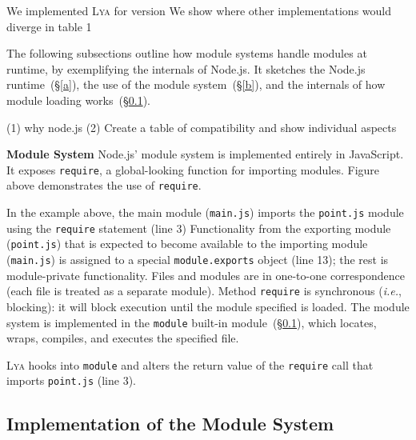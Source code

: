 \documentclass[letterpaper,twocolumn,10pt]{article}
\def\ie{{\em i.e.}, }
\newcommand{\heading}[1]{\vspace{2pt}\noindent\textbf{#1}\enspace}
\newcommand{\ttt}[1]{\texttt{#1}}
\newcommand{\sx}[1]{(\S\ref{#1})}
\newcommand{\sys}{{\scshape Lya}\xspace}
\newcommand{\fixme}[1]{{\color{red}#1}}
\begin{document}
We implemented \sys for version 
We show where other implementations would diverge in table 1

The following subsections outline how module systems handle modules at runtime, by exemplifying the internals of Node.js.
It sketches the Node.js runtime~\sx{a}, the use of the module system~\sx{b}, and the internals of how module loading works~\sx{c}.

(1) why node.js
(2) Create a table of compatibility and show individual aspects

\heading{Module System}
Node.js' module system is implemented entirely in JavaScript.
It exposes \ttt{require}, a global-looking function for importing modules.
\fixme{Figure} above demonstrates the use of \ttt{require}.

% 

In the example above, the main module (\ttt{main.js}) imports the \ttt{point.js} module using the \ttt{require} statement (line 3)
Functionality from the exporting module (\ttt{point.js}) that is expected to become available to the importing module (\ttt{main.js}) is assigned to a special \ttt{module.exports} object (line 13);
  the rest is module-private functionality.
Files and modules are in one-to-one correspondence (each file is treated as a separate module).
Method \ttt{require} is synchronous (\ie blocking):
  it will block execution until the module specified is loaded.
The module system is implemented in the \ttt{module} built-in module~\sx{c}, which locates, wraps, compiles, and executes the specified file.

\sys hooks into \ttt{module} and alters the return value of the \ttt{require} call that imports \ttt{point.js} (line 3).

\subsection{Implementation of the Module System}
\label{c}
\end{document}
